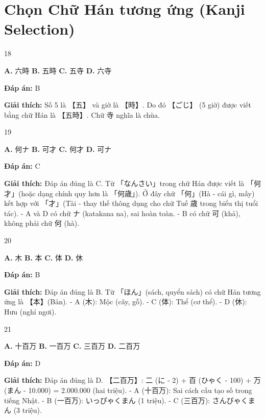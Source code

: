 \documentclass[12pt,a4paper]{report}
\newcommand{\source}[1]{}
\newcommand{\choice}[2]{\textbf{#1.} #2 \quad}
\newcommand{\answer}[1]{\par\textbf{Đáp án:} #1}
\newcommand{\confidence}[1]{}
\newcommand{\explain}[1]{\par\textbf{Giải thích:} #1\vspace{0.5cm}}
\begin{document}
\section{Chọn Chữ Hán tương ứng (Kanji Selection)}

\begin{question}{18}
\source{Q22_76_20251121082832.webp}
\choice{A}{六時}
\choice{B}{五時}
\choice{C}{五寺}
\choice{D}{六寺}
\answer{B}
\confidence{high}
\explain{Số 5 là 【五】 và giờ là 【時】. Do đó 【ごじ】 (5 giờ) được viết bằng chữ Hán là 【五時】. Chữ 寺 nghĩa là chùa.}
\end{question}

\begin{question}{19}
\source{3.webp}
\choice{A}{何ナ}
\choice{B}{可才}
\choice{C}{何才}
\choice{D}{可ナ}
\answer{C}
\confidence{high}
\explain{Đáp án đúng là C. Từ 「なんさい」trong chữ Hán được viết là 「何才」(hoặc dạng chính quy hơn là 「何歳」). Ở đây chữ 「何」(Hà - cái gì, mấy) kết hợp với 「才」(Tài - thay thế thông dụng cho chữ Tuế 歳 trong biểu thị tuổi tác).
- A và D có chữ ナ (katakana na), sai hoàn toàn.
- B có chữ 可 (khả), không phải chữ 何 (hà).}
\end{question}

\begin{question}{20}
\source{12.webp}
\choice{A}{木}
\choice{B}{本}
\choice{C}{体}
\choice{D}{休}
\answer{B}
\confidence{high}
\explain{Đáp án đúng là B. Từ 「ほん」(sách, quyển sách) có chữ Hán tương ứng là 【本】(Bản).
- A (木): Mộc (cây, gỗ).
- C (体): Thể (cơ thể).
- D (休): Hưu (nghỉ ngơi).}
\end{question}

\begin{question}{21}
\source{13.webp}
\choice{A}{十百万}
\choice{B}{一百万}
\choice{C}{三百万}
\choice{D}{二百万}
\answer{D}
\confidence{high}
\explain{Đáp án đúng là D. 【二百万】: 二 (に - 2) + 百 (ひゃく - 100) + 万 (まん - 10.000) = 2.000.000 (hai triệu).
- A (十百万): Sai cách cấu tạo số trong tiếng Nhật.
- B (一百万): いっぴゃくまん (1 triệu).
- C (三百万): さんびゃくまん (3 triệu).}
\end{question}
\end{document}
